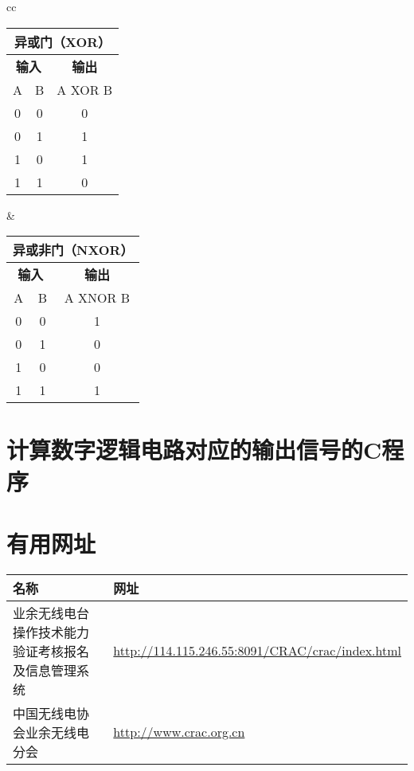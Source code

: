 \bigskip

\begin{tabular}{cc}%
	\begin{tabular}{|c|c|c|}
		\multicolumn{3}{c}{\textbf{异或门（XOR）}} \\
		\hline
		\multicolumn{2}{|c|}{\textbf{输入}} & \textbf{输出} \\
		\hline
		A & B & A XOR B \\
		\hline
		0 & 0 & 0 \\
		\hline
		0 & 1 & 1 \\
		\hline
		1 & 0 & 1 \\
		\hline
		1 & 1 & 0 \\
		\hline
	\end{tabular} &
	\begin{tabular}{|c|c|c|}
		\multicolumn{3}{c}{\textbf{异或非门（NXOR）}} \\
		\hline
		\multicolumn{2}{|c|}{\textbf{输入}} & \textbf{输出} \\
		\hline
		A & B & A XNOR B \\
		\hline
		0 & 0 & 1 \\
		\hline
		0 & 1 & 0 \\
		\hline
		1 & 0 & 0 \\
		\hline
		1 & 1 & 1 \\
		\hline
	\end{tabular} \tabularnewline
\end{tabular}

\newpage

\section{计算数字逻辑电路对应的输出信号的C程序}



\newpage

\section{有用网址}

\begin{longtable}{|p{8cm}|p{8cm}|}
	\hline
	\textbf{名称} & \textbf{网址} \\
	\hline
	业余无线电台操作技术能力验证考核报名及信息管理系统 & \url{http://114.115.246.55:8091/CRAC/crac/index.html} \\
	\hline
	中国无线电协会业余无线电分会 & \url{http://www.crac.org.cn} \\
	\hline
\end{longtable}
